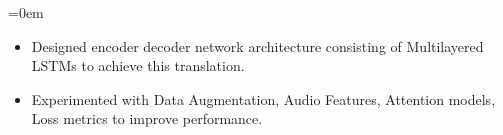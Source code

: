 \documentclass{article}
\makeatletter
\newcommand{\headerrow}[2]
{\begin{tabular*}{\linewidth}{l@{\extracolsep{\fill}}r}
	#1 &
	#2 \\
\end{tabular*}}
\makeatother
\begin{document}
\begin{list} {}{\leftmargin=0em}
\begin{itemize}
        \item Designed encoder decoder network architecture consisting of Multilayered LSTMs to achieve this translation.
        \item Experimented with Data Augmentation, Audio Features, Attention models, Loss metrics to improve performance.
    \end{itemize}
\end{list}
\end{document}
